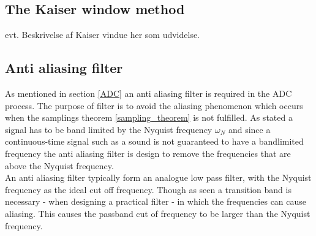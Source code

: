 \subsection{The Kaiser window method }
evt. Beskrivelse af Kaiser vindue her som udvidelse. 

\subsection{Anti aliasing filter}
As mentioned in section \ref{ADC} an anti aliasing filter is required in the ADC process. The purpose of filter is to avoid the aliasing phenomenon which occurs when the samplings theorem \ref{sampling_theorem} is not fulfilled. As stated a signal has to be band limited by the Nyquist frequency $\omega_N$ and since a continuous-time signal such as a sound is not guaranteed to have a bandlimited frequency the anti aliasing filter is design to remove the frequencies that are above the Nyquist frequency. \\
An anti aliasing filter typically form an analogue low pass filter, with the Nyquist frequency as the ideal cut off frequency. Though as seen a transition band is necessary - when designing a practical filter - in which the frequencies can cause aliasing. This causes the passband cut of frequency to be larger than the Nyquist frequency.           